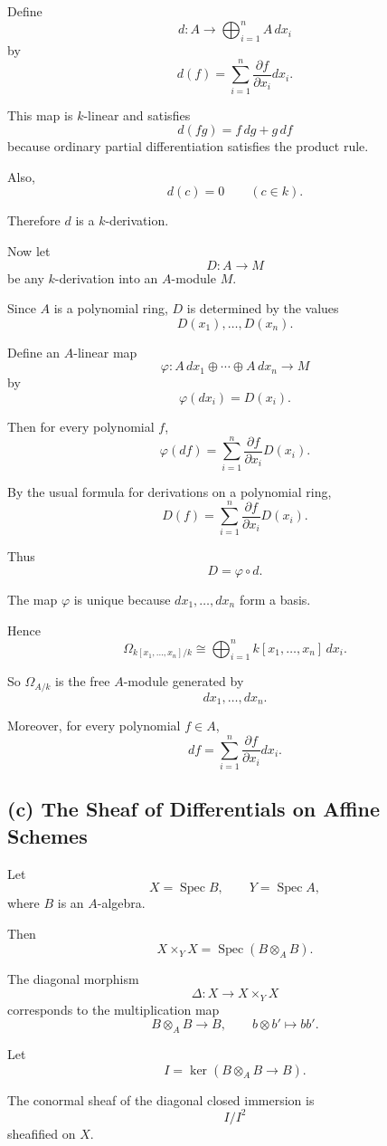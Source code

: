 \documentclass[12pt,a4paper]{article}
\theoremstyle{notespace}
\begin{document}
Define
\[
d:A\to \bigoplus_{i=1}^n A\,dx_i
\]
by
\[
d(f)=\sum_{i=1}^n
\frac{\partial f}{\partial x_i}dx_i.
\]

This map is \(k\)-linear and satisfies
\[
d(fg)=f\,dg+g\,df
\]
because ordinary partial differentiation satisfies the product rule.

Also,
\[
d(c)=0
\qquad
(c\in k).
\]

Therefore \(d\) is a \(k\)-derivation.

Now let
\[
D:A\to M
\]
be any \(k\)-derivation into an \(A\)-module \(M\).

Since \(A\) is a polynomial ring, \(D\) is determined by the values
\[
D(x_1),\ldots,D(x_n).
\]

Define an \(A\)-linear map
\[
\varphi:
A\,dx_1\oplus\cdots\oplus A\,dx_n
\longrightarrow M
\]
by
\[
\varphi(dx_i)=D(x_i).
\]

Then for every polynomial \(f\),
\[
\varphi(df)
=
\sum_{i=1}^n
\frac{\partial f}{\partial x_i}D(x_i).
\]

By the usual formula for derivations on a polynomial ring,
\[
D(f)
=
\sum_{i=1}^n
\frac{\partial f}{\partial x_i}D(x_i).
\]

Thus
\[
D=\varphi\circ d.
\]

The map \(\varphi\) is unique because \(dx_1,\ldots,dx_n\) form a basis.

Hence
\[
\boxed{
	\Omega_{k[x_1,\ldots,x_n]/k}
	\cong
	\bigoplus_{i=1}^n k[x_1,\ldots,x_n]\,dx_i.
}
\]

So \(\Omega_{A/k}\) is the free \(A\)-module generated by
\[
dx_1,\ldots,dx_n.
\]

Moreover, for every polynomial \(f\in A\),
\[
\boxed{
	df=\sum_{i=1}^n
	\frac{\partial f}{\partial x_i}dx_i.
}
\]

\subsection*{(c) The Sheaf of Differentials on Affine Schemes}

Let
\[
X=\operatorname{Spec}B,
\qquad
Y=\operatorname{Spec}A,
\]
where \(B\) is an \(A\)-algebra.

Then
\[
X\times_Y X
=
\operatorname{Spec}(B\otimes_A B).
\]

The diagonal morphism
\[
\Delta:X\to X\times_Y X
\]
corresponds to the multiplication map
\[
B\otimes_A B\to B,
\qquad
b\otimes b'\mapsto bb'.
\]

Let
\[
I=\ker(B\otimes_A B\to B).
\]

The conormal sheaf of the diagonal closed immersion is
\[
I/I^2
\]
sheafified on \(X\).
\end{document}
